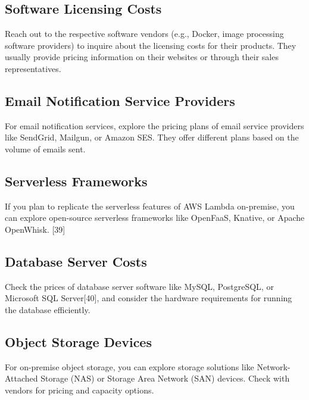\subsection{Software Licensing Costs}
Reach out to the respective software vendors (e.g., Docker, image processing software providers) to inquire about the licensing costs for their products. They usually provide pricing information on their websites or through their sales representatives.

\subsection{Email Notification Service Providers}
For email notification services, explore the pricing plans of email service providers like SendGrid, Mailgun, or Amazon SES. They offer different plans based on the volume of emails sent.

\subsection{Serverless Frameworks}
If you plan to replicate the serverless features of AWS Lambda on-premise, you can explore open-source serverless frameworks like OpenFaaS, Knative, or Apache OpenWhisk. [39]

\subsection{Database Server Costs}
Check the prices of database server software like MySQL, PostgreSQL, or Microsoft SQL Server[40], and consider the hardware requirements for running the database efficiently.

\subsection{Object Storage Devices}
For on-premise object storage, you can explore storage solutions like Network-Attached Storage (NAS) or Storage Area Network (SAN) devices. Check with vendors for pricing and capacity options.\newline

